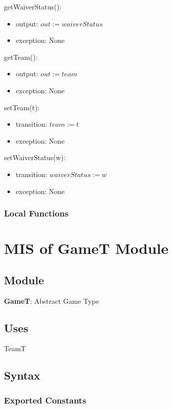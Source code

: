 \documentclass[12pt, titlepage]{article}
\begin{document}
\noindent getWaiverStatus():
\begin{itemize}
  \item output: $out := waiverStatus$
  \item exception: None
\end{itemize}

\noindent getTeam():
\begin{itemize}
  \item output: $out := team$
  \item exception: None
\end{itemize}

\noindent setTeam(t):
\begin{itemize}
  \item transition: $team := t$
  \item exception: None
\end{itemize}

\noindent setWaiverStatus(w):
\begin{itemize}
  \item transition: $waiverStatus := w$
  \item exception: None
\end{itemize}


\subsubsection{Local Functions}

\newpage

\section{MIS of GameT Module} \label{GameTModule}

\subsection{Module}
\textbf{GameT}: Abstract Game Type

\subsection{Uses}
TeamT

\subsection{Syntax}

\subsubsection{Exported Constants}
\end{document}
